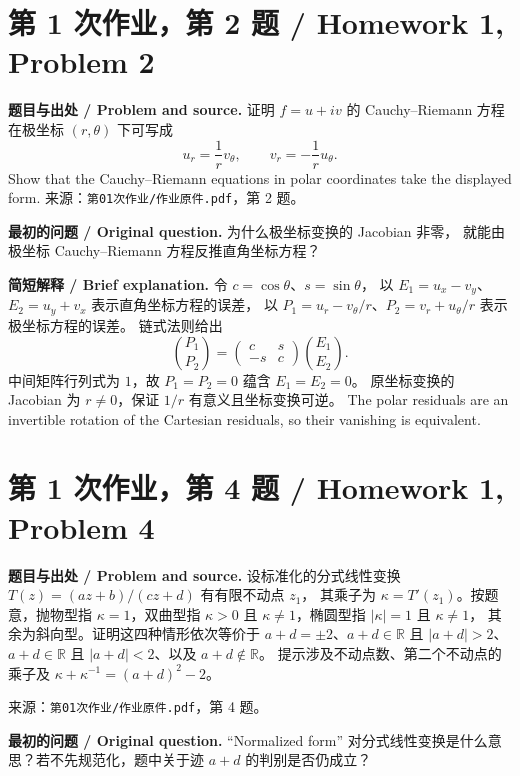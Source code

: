 \documentclass[11pt,a4paper]{ctexart}
\begin{document}

\section{第 1 次作业，第 2 题 / Homework 1, Problem 2}
\label{note:complex-analysis-hw01-q02}
\textbf{题目与出处 / Problem and source.}
证明 $f=u+iv$ 的 Cauchy--Riemann 方程在极坐标 $(r,\theta)$ 下可写成
\[
u_r=\frac1r v_\theta,\qquad v_r=-\frac1r u_\theta.
\]
Show that the Cauchy--Riemann equations in polar coordinates take the
displayed form. 来源：\texttt{第01次作业/作业原件.pdf}，第 2 题。

\textbf{最初的问题 / Original question.} 为什么极坐标变换的 Jacobian 非零，
就能由极坐标 Cauchy--Riemann 方程反推直角坐标方程？

\textbf{简短解释 / Brief explanation.} 令 $c=\cos\theta$、$s=\sin\theta$，
以 $E_1=u_x-v_y$、$E_2=u_y+v_x$ 表示直角坐标方程的误差，
以 $P_1=u_r-v_\theta/r$、$P_2=v_r+u_\theta/r$ 表示极坐标方程的误差。
链式法则给出
\[
\binom{P_1}{P_2}=
\begin{pmatrix}c&s\\-s&c\end{pmatrix}\binom{E_1}{E_2}.
\]
中间矩阵行列式为 $1$，故 $P_1=P_2=0$ 蕴含 $E_1=E_2=0$。
原坐标变换的 Jacobian 为 $r\ne0$，保证 $1/r$ 有意义且坐标变换可逆。
The polar residuals are an invertible rotation of the Cartesian residuals,
so their vanishing is equivalent.


\section{第 1 次作业，第 4 题 / Homework 1, Problem 4}
\label{note:complex-analysis-hw01-q04}
\textbf{题目与出处 / Problem and source.}
设标准化的分式线性变换 $T(z)=(az+b)/(cz+d)$ 有有限不动点 $z_1$，
其乘子为 $\kappa=T'(z_1)$。按题意，抛物型指 $\kappa=1$，双曲型指
$\kappa>0$ 且 $\kappa\ne1$，椭圆型指 $|\kappa|=1$ 且 $\kappa\ne1$，
其余为斜向型。证明这四种情形依次等价于
$a+d=\pm2$、$a+d\in\mathbb R$ 且 $|a+d|>2$、
$a+d\in\mathbb R$ 且 $|a+d|<2$、以及 $a+d\notin\mathbb R$。
提示涉及不动点数、第二个不动点的乘子及
$\kappa+\kappa^{-1}=(a+d)^2-2$。

来源：\texttt{第01次作业/作业原件.pdf}，第 4 题。

\textbf{最初的问题 / Original question.}
``Normalized form'' 对分式线性变换是什么意思？若不先规范化，题中关于迹
$a+d$ 的判别是否仍成立？
\end{document}
